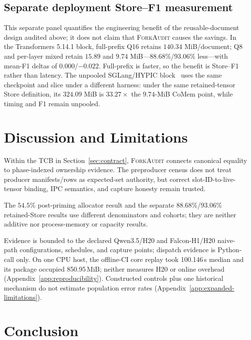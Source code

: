 \documentclass{article}
\newcommand{\method}{\textsc{ForkAudit}}
\begin{document}
\FloatBarrier
\subsection{Separate deployment Store--F1 measurement}

This separate panel quantifies the engineering benefit of the reusable-document
design audited above; it does not claim that \method{} causes the savings.  In
the Transformers 5.14.1 block, full-prefix Q16
retains $140.34$ MiB/document; Q8 and per-layer mixed retain $15.89$ and $9.74$
MiB---$88.68\%$/$93.06\%$ less---with mean-F1 deltas of $0.000$/$-0.022$.
Full-prefix is faster, so the benefit is Store--F1 rather than latency.  The
unpooled SGLang/HYPIC block~\citep{liu2026hypic} uses the same checkpoint and
slice under a different harness: under the same retained-tensor Store
definition, its $324.09$ MiB is $33.27\times$ the $9.74$-MiB CoMem point, while
timing and F1 remain unpooled.



\section{Discussion and Limitations}
\label{sec:limitations}

Within the TCB in Section~\ref{sec:contract}, \method{} connects canonical
equality to phase-indexed ownership evidence.  The preproducer census does not
treat producer manifests/rows as expected-set authority, but correct
slot-ID-to-live-tensor binding, IPC semantics, and capture honesty remain trusted.

The $54.5\%$ post-priming allocator result and the separate
$88.68\%$/$93.06\%$ retained-Store results use different denominators and
cohorts; they are neither additive nor process-memory or capacity results.

Evidence is bounded to the declared Qwen3.5/H20 and Falcon-H1/H20 naive-path
configurations, schedules, and capture points; dispatch evidence is Python-call
only.  On one CPU host, the offline-CI core replay took 100.146\,s median and
its package occupied 850.95\,MiB; neither measures H20 or online overhead
(Appendix~\ref{app:reproducibility}).  Constructed controls plus one historical
mechanism do not estimate population error rates
(Appendix~\ref{app:expanded-limitations}).

\FloatBarrier

\section{Conclusion}
\end{document}
